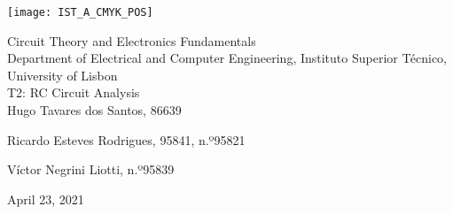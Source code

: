 
\thispagestyle {empty}

\texttt{[image: IST\_A\_CMYK\_POS]}

\begin{center}
%
\vspace{1.0cm}

\vspace{1cm}
{\FontLb Circuit Theory and Electronics Fundamentals} \\ %
\vspace{1cm}
{\FontSn Department of Electrical and Computer Engineering, Instituto Superior Técnico, University of Lisbon} \\ %
\vspace{1cm}
{\FontSn T2: RC Circuit Analysis} \\
\vspace{1cm}
{\FontSn Hugo Tavares dos Santos, 86639}
\par{\FontSn Ricardo Esteves Rodrigues, 95841, n.º95821}
\par{\FontSn Víctor Negrini Liotti, n.º95839}
\vspace{1.0cm}




{\FontSn April 23, 2021} \\ %
%
\end{center}

